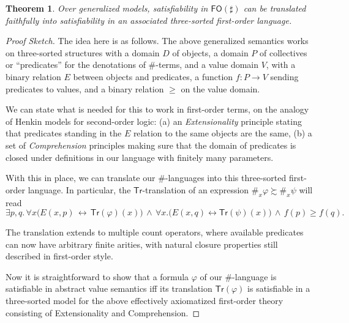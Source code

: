 \documentclass[12pt,oneside,reqno]{amsart}
\newtheorem{theorem}{Theorem}
\theoremstyle{definition}
\begin{document}

\begin{theorem} 
Over generalized models, satisfiability in $\mathsf{FO}(\sharp)$ can be translated faithfully into satisfiability in an associated three-sorted first-order language.
\end{theorem}
\begin{proof}[Proof Sketch]
The idea here is as follows. The above generalized semantics works on three-sorted structures with a domain $D$ of objects, a domain $P$ of collectives or ``predicates'' for the denotations of $\#$-terms, and a value domain $V$, with a binary relation $E$ between objects and predicates, a function $f:P\rightarrow V$ sending predicates to values, and a binary relation $\geq$  on the value domain. 

We can state what is needed for this to work in first-order terms, on the analogy of Henkin models for second-order logic: (a) an \emph{Extensionality} principle stating that predicates standing in the $E$ relation to the same objects are the same, (b) a set of \emph{Comprehension} principles making sure that the domain of predicates is closed under definitions in our language with finitely many parameters.  

With this in place, we can  translate our $\#$-languages into this three-sorted first-order language. In particular, the $\mathsf{Tr}$-translation of an expression $\#_x \varphi \succsim \#_x \psi$ will read\vspace{0.5ex}   $$\exists p, q.\, \forall x \big(E(x,p)\, \leftrightarrow\, \mathsf{Tr}(\varphi)(x)\big) \,\land\, \forall x. \big(E(x,q) \leftrightarrow \mathsf{Tr}(\psi)(x)\big) \, \land\, f(p) \geq f(q).$$ 

\noindent The translation extends to multiple count operators, where available predicates can now have arbitrary finite arities, with natural closure properties  still described in first-order style.


Now it is straightforward to show that a formula $\varphi$ of our $\#$-language is satisfiable in abstract value semantics iff its translation $\mathsf{Tr}(\varphi)$ is satisfiable in a three-sorted model for the above effectively axiomatized first-order theory consisting of Extensionality and Comprehension.\vspace{-1ex}\end{proof}
\end{document}
